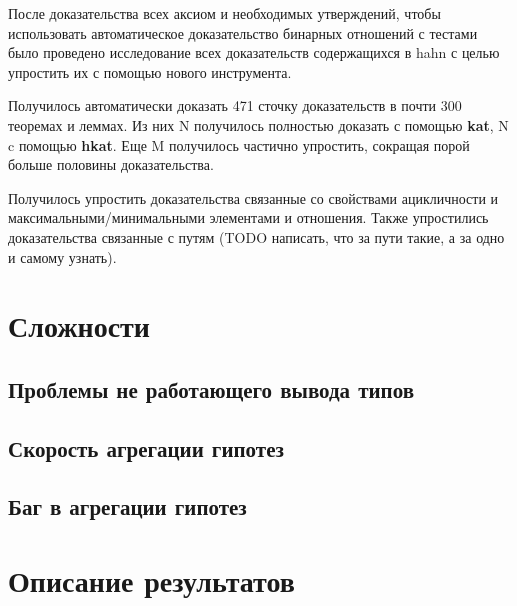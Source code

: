 \documentclass[times
              ]{itmo-student-thesis}
\begin{document}
  После доказательства всех аксиом и необходимых утверждений, чтобы использовать автоматическое доказательство бинарных отношений с тестами было проведено исследование всех доказательств содержащихся в hahn с целью упростить их с помощью нового инструмента.

  Получилось автоматически доказать 471 сточку доказательств в почти 300 теоремах и леммах. Из них N получилось полностью доказать с помощью \textbf{kat}, N c помощью \textbf{hkat}.
  Еще M получилось частично упростить, сокращая порой больше половины доказательства.

  Получилось упростить доказательства связанные со свойствами ацикличности и максимальными/минимальными элементами и отношения.
  Также упростились доказательства связанные с путям (TODO написать, что за пути такие, а за одно и самому узнать).

  \section{Сложности}
    \subsection{Проблемы не работающего вывода типов}
    \subsection{Скорость агрегации гипотез}
    \subsection{Баг в агрегации гипотез}
  \section{Описание результатов}




\end{document}
